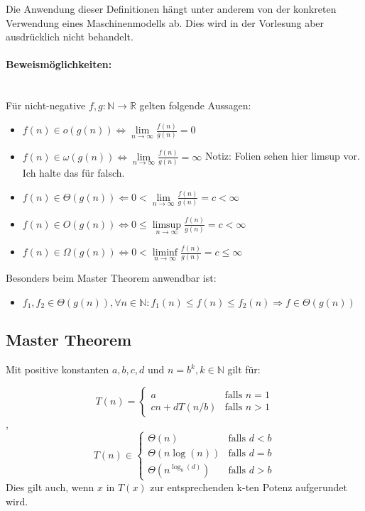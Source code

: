 \documentclass[11pt]{article}
\begin{document}
Die Anwendung dieser Definitionen hängt unter anderem von der konkreten Verwendung eines Maschinenmodells ab. Dies wird in der Vorlesung aber ausdrücklich nicht behandelt.

\paragraph{Beweismöglichkeiten:}\mbox{}\\

Für nicht-negative $f,g\colon\mathbb{N}\to\mathbb{R}$ gelten folgende Aussagen:
\begin{itemize}
\item $f(n) \in o(g(n)) \Longleftrightarrow \lim\limits_{n\to \infty}\frac{f(n)}{g(n)}=0$
\item $f(n) \in \omega (g(n)) \Longleftrightarrow \lim\limits_{n\to \infty}\frac{f(n)}{g(n)}=\infty$ Notiz: Folien sehen hier limsup vor. Ich halte das für falsch.
\item $f(n) \in \Theta (g(n)) \Longleftarrow 0 < \lim\limits_{n\to \infty}\frac{f(n)}{g(n)}=c < \infty$
\item $f(n) \in O(g(n)) \Longleftrightarrow 0 \leq \limsup\limits_{n\to \infty}\frac{f(n)}{g(n)}=c < \infty$
\item $f(n) \in \Omega (g(n)) \Longleftrightarrow 0 < \liminf\limits_{n\to \infty}\frac{f(n)}{g(n)}=c \leq \infty$
\end{itemize}
Besonders beim Master Theorem anwendbar ist:
\begin{itemize}
\item $f_1, f_2\in \Theta (g(n)), \forall n\in \mathbb{N}: f_1(n) \leq f(n) \leq f_2(n) \Longrightarrow f\in \Theta (g(n))$
\end{itemize}

\subsection{Master Theorem}

Mit positive konstanten $a,b,c,d \text{ und } n=b^k, k \in \mathbb{N}$ gilt für:

\[
T(n) = 	\begin{cases}
		a & \text{falls } n=1 \\
		cn + dT(n/b) & \text{falls } n>1
		\end{cases}
\]
,
\[
T(n)\in \begin{cases}
		\Theta (n) & \text{falls } d<b \\
		\Theta (n\log(n)) & \text{falls } d=b \\
		\Theta (n^{\log_{b}(d)}) & \text{falls } d>b
		\end{cases}
\]
Dies gilt auch, wenn $x$ in $T(x)$ zur entsprechenden k-ten Potenz aufgerundet wird.
\end{document}
